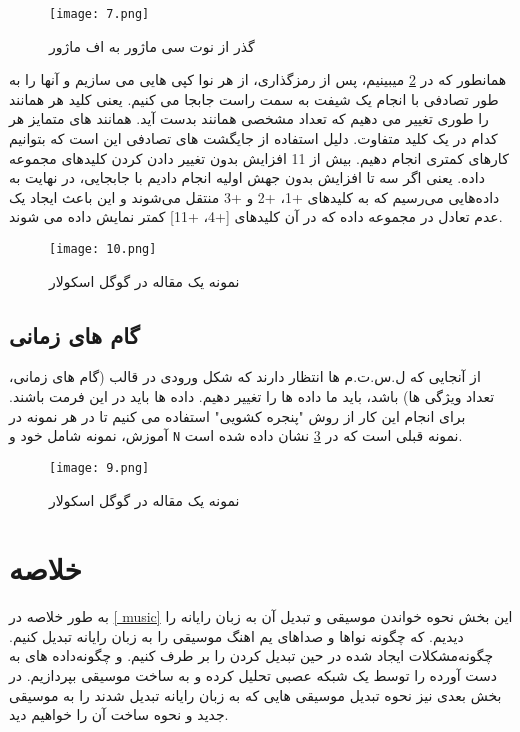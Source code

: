 \begin{figure}[!h]
\texttt{[image: 7.png]}
\caption{گذر از نوت سی ماژور به اف ماژور}\label{fig.7}
\end{figure}
همانطور که در \cref{fig.10} میبینیم،  پس از رمزگذاری، از هر نوا کپی هایی  می سازیم و
آنها را به طور تصادفی با انجام یک شیفت  به سمت راست جابجا می کنیم.  یعنی کلید هر همانند را طوری تغییر می دهیم که 
تعداد مشخصی همانند بدست آید.  
همانند های متمایز هر کدام در یک کلید متفاوت. دلیل استفاده از جایگشت های تصادفی این است که بتوانیم کارهای کمتری انجام دهیم. 
بیش از 11 افزایش بدون تغییر دادن کردن کلیدهای مجموعه داده. یعنی اگر سه تا افزایش بدون جهش اولیه انجام دادیم
با جابجایی، در نهایت به داده‌هایی می‌رسیم که به کلیدهای +1، +2 و +3 منتقل می‌شوند و این باعث ایجاد یک
عدم تعادل در مجموعه داده که در آن کلیدهای [+4، +11] کمتر نمایش داده می شوند. 
\begin{figure}[!h]
\texttt{[image: 10.png]}
\caption{نمونه یک مقاله در گوگل اسکولار}\label{fig.10}
\end{figure}
\subsection{گام های زمانی}
از آنجایی که
ل.س.ت.م
ها انتظار دارند که شکل ورودی در قالب (گام های زمانی، تعداد ویژگی ها) باشد، باید ما داده ها را تغییر دهیم.
داده ها باید در این فرمت باشند. برای انجام این کار از روش "پنجره کشویی" استفاده می کنیم تا در هر نمونه در
آموزش، نمونه شامل خود و
\verb;N;
نمونه قبلی است که در 
\cref{fig.9}
نشان داده شده است.
\cite{hewahi2019generation}
\begin{figure}[!h]
\texttt{[image: 9.png]}
\caption{نمونه یک مقاله در گوگل اسکولار}\label{fig.9}
\end{figure}
\section{خلاصه}
به طور خلاصه در 
\ref{ music}
این بخش نحوه خواندن موسیقی و تبدیل آن به زبان رایانه را دیدیم. که چگونه نوا‌ها و صداهای یم اهنگ موسیقی را به زبان رایانه تبدیل کنیم. چگونه‌مشکلات ایجاد شده در حین تبدیل کردن را بر طرف کنیم. و چگونه‌داده های به دست آورده را توسط یک شبکه عصبی تحلیل کرده و به ساخت موسیقی بپردازیم. در بخش بعدی نیز نحوه تبدیل موسیقی هایی که به زبان رایانه تبدیل شدند را به موسیقی جدید و نحوه ساخت آن را خواهیم دید.










































